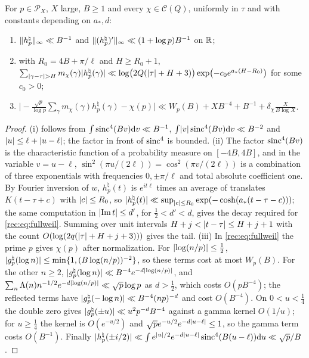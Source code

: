 \begin{lemma}\label{rec:lem:coshtest}
For $p\in\mathcal P_X$, $X$ large, $B\ge1$ and every $\chi\in\mathcal C(Q)$, uniformly in $\tau$ and with constants
depending on $a_*,d$:
\begin{enumerate}
\item $\lVert h_p^\natural\rVert_\infty\ll B^{-1}$ and $\lVert(h_p^\natural)'\rVert_\infty\ll(1+\log p)B^{-1}$ on $\mathbb{R}$;
\item with $R_0=4B+\pi/\ell$ and $H\ge R_0+1$,
$\sum_{\lvert\gamma-\tau\rvert>H}m_\chi(\gamma)\lvert h_p^\natural(\gamma)\rvert\ll\log\bigl(2Q(\lvert\tau\rvert+H+3)\bigr)\exp\bigl(-c_0e^{a_*(H-R_0)}\bigr)$
for some $c_0>0$;
\item $\bigl\lvert-\frac{\sqrt p}{\log p}\sum_\gamma m_\chi(\gamma)h_p^\natural(\gamma)-\chi(p)\bigr\rvert\ll W_p(B)+XB^{-4}+B^{-1}+\delta_\chi\frac X{B\log X}$.
\end{enumerate}
\end{lemma}

\begin{proof}
(i) follows from $\int\operatorname{sinc}^4(Bv)\mathrm{d} v\ll B^{-1}$, $\int\lvert v\rvert\operatorname{sinc}^4(Bv)\mathrm{d} v\ll B^{-2}$ and
$\lvert u\rvert\le\ell+\lvert u-\ell\rvert$; the factor in front of $\operatorname{sinc}^4$ is bounded. (ii) The factor $\operatorname{sinc}^4(Bv)$ is
the characteristic function of a probability measure on $[-4B,4B]$, and in the variable $v=u-\ell$,
$\sin^2(\pi u/(2\ell))=\cos^2(\pi v/(2\ell))$ is a combination of three exponentials with frequencies $0,\pm\pi/\ell$
and total absolute coefficient one. By Fourier inversion of $w$, $h_p^\natural(t)$ is $e^{it\ell}$ times an average of
translates $K(t-\tau+c)$ with $\lvert c\rvert\le R_0$, so $\lvert h_p^\natural(t)\rvert\ll\sup_{\lvert c\rvert\le R_0}\exp(-\cosh(a_*(t-\tau-c)))$; the
same computation in $\lvert\operatorname{Im} t\rvert\le d'$, for $\tfrac12<d'<d$, gives the decay required for \eqref{rec:eq:fullweil}.
Summing over unit intervals $H+j<\lvert t-\tau\rvert\le H+j+1$ with the count
$O(\log(2q(\lvert\tau\rvert+H+j+3)))$ gives the tail. (iii) In \eqref{rec:eq:fullweil} the prime $p$ gives $\chi(p)$ after
normalization. For $\lvert\log(n/p)\rvert\le\tfrac12$, $\lvert g_p^\natural(\log n)\rvert\le\min\{1,(B\log(n/p))^{-2}\}$, so these
terms cost at most $W_p(B)$. For the other $n\ge2$, $\lvert g_p^\natural(\log n)\rvert\ll B^{-4}e^{-d\lvert\log(n/p)\rvert}$, and
$\sum_n\Lambda(n)n^{-1/2}e^{-d\lvert\log(n/p)\rvert}\ll\sqrt p\log p$ as $d>\tfrac12$, which costs $O(pB^{-4})$; the reflected
terms have $\lvert g_p^\natural(-\log n)\rvert\ll B^{-4}(np)^{-d}$ and cost $O(B^{-4})$. On $0<u<\tfrac14$ the double zero
gives $\lvert g_p^\natural(\pm u)\rvert\ll u^2p^{-d}B^{-4}$ against a gamma kernel $O(1/u)$; for $u\ge\tfrac14$ the kernel is
$O(e^{-u/2})$ and $\sqrt pe^{-u/2}e^{-d\lvert u-\ell\rvert}\le1$, so the gamma term costs $O(B^{-1})$. Finally
$\lvert h_p^\natural(\pm i/2)\rvert\ll\int e^{\lvert u\rvert/2}e^{-d\lvert u-\ell\rvert}\operatorname{sinc}^4(B(u-\ell))\mathrm{d} u\ll\sqrt p/B$.
\end{proof}

